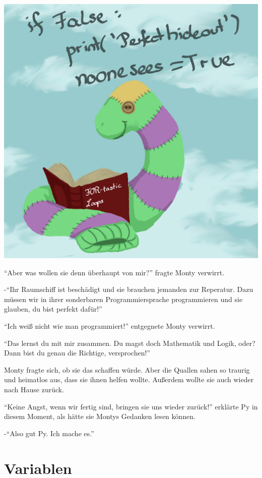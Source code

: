 \documentclass[a5paper,12pt,twoside,openright]{scrbook}
\begin{document}
\begin{center}
 \includegraphics[scale = 0.1]{py.png}
\end{center}
"`Aber was wollen sie denn überhaupt von mir?"' fragte Monty verwirrt.

-"`Ihr Raumschiff ist beschädigt und sie brauchen jemanden zur Reperatur. Dazu müssen wir in ihrer 
sonderbaren Programmiersprache programmieren und sie glauben, du bist perfekt dafür!"'

"`Ich weiß nicht wie man programmiert!"' entgegnete Monty verwirrt.

"`Das lernst du mit mir zusammen. Du magst doch Mathematik und Logik, oder? Dann bist du genau die Richtige, versprochen!"'

Monty fragte sich, ob sie das schaffen würde. Aber die Quallen sahen so traurig und heimatlos aus, dass sie ihnen helfen wollte.
Au{\ss}erdem wollte sie auch wieder nach Hause zurück. 

"`Keine Angst, wenn wir fertig sind, bringen sie uns wieder zurück!"' erklärte Py in diesem Moment, 
als hätte sie Montys Gedanken lesen können.

-"`Also gut Py. Ich mache es."'
 
\chapter{Variablen}
\end{document}
